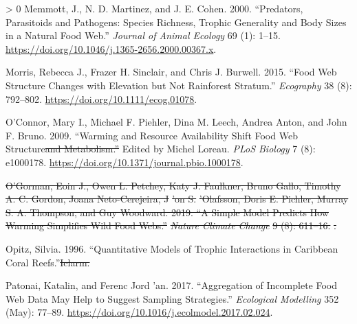 \documentclass{article}
\newlength{\cslhangindent} %
\newenvironment{CSLReferences}[3] %
 {%
  \setlength{\parindent}{0pt} %
  \ifodd #1 \everypar{\setlength{\hangindent}{\cslhangindent}}\ignorespaces\fi %
  \ifnum #2 > 0 %
  \setlength{\parskip}{#2\baselineskip} %
  \fi %
 }%
 {} %
\providecommand{\DIFaddtex}[1]{{\protect\color{blue}\uwave{#1}}} %
\providecommand{\DIFdeltex}[1]{{\protect\color{red}\sout{#1}}}                      %
\providecommand{\DIFaddbegin}{} %
\providecommand{\DIFaddend}{} %
\providecommand{\DIFdelbegin}{} %
\providecommand{\DIFdelend}{} %
\providecommand{\DIFadd}[1]{\texorpdfstring{\DIFaddtex{#1}}{#1}} %
\providecommand{\DIFdel}[1]{\texorpdfstring{\DIFdeltex{#1}}{}} %
\newcommand{\DIFscaledelfig}{0.5}
\newlength{\DIFdelgraphicswidth} %
\newlength{\DIFdelgraphicsheight} %
\newcommand{\DIFaddincludegraphics}[2][]{{\color{blue}\fbox{\DIFOincludegraphics[#1]{#2}}}} %
\newcommand{\DIFdelincludegraphics}[2][]{%
\sbox{\DIFdelgraphicsbox}{\DIFOincludegraphics[#1]{#2}}%
\settoboxwidth{\DIFdelgraphicswidth}{\DIFdelgraphicsbox} %
\settoboxtotalheight{\DIFdelgraphicsheight}{\DIFdelgraphicsbox} %
\scalebox{\DIFscaledelfig}{%
\parbox[b]{\DIFdelgraphicswidth}{\usebox{\DIFdelgraphicsbox}\\[-\baselineskip] \rule{\DIFdelgraphicswidth}{0em}}\llap{\resizebox{\DIFdelgraphicswidth}{\DIFdelgraphicsheight}{%
\setlength{\unitlength}{\DIFdelgraphicswidth}%
\begin{picture}(1,1)%
\thicklines\linethickness{2pt} %
{\color[rgb]{1,0,0}\put(0,0){\framebox(1,1){}}}%
{\color[rgb]{1,0,0}\put(0,0){\line( 1,1){1}}}%
{\color[rgb]{1,0,0}\put(0,1){\line(1,-1){1}}}%
\end{picture}%
}\hspace*{3pt}}} %
} %
\DeclareRobustCommand{\DIFaddbegin}{\DIFOaddbegin \let\includegraphics\DIFaddincludegraphics} %
\DeclareRobustCommand{\DIFaddend}{\DIFOaddend \let\includegraphics\DIFOincludegraphics} %
\DeclareRobustCommand{\DIFdelbegin}{\DIFOdelbegin \let\includegraphics\DIFdelincludegraphics} %
\DeclareRobustCommand{\DIFdelend}{\DIFOaddend \let\includegraphics\DIFOincludegraphics} %
\begin{document}
\begin{CSLReferences}{1}{0}
\leavevmode\hypertarget{ref-memmottPredatorsParasitoidsPathogens2000}{}%
Memmott, J., N. D. Martinez, and J. E. Cohen. 2000. \DIFaddbegin {\DIFaddend ``Predators,
Parasitoids and Pathogens: Species Richness, Trophic Generality and Body
Sizes in a Natural Food Web.''\DIFaddbegin } \DIFaddend \emph{Journal of Animal Ecology} 69 (1):
1--15. \url{https://doi.org/10.1046/j.1365-2656.2000.00367.x}.

\leavevmode\hypertarget{ref-morrisFoodWebStructure2015}{}%
Morris, Rebecca J., Frazer H. Sinclair, and Chris J. Burwell. 2015.
\DIFaddbegin {\DIFaddend ``Food Web Structure Changes with Elevation but Not Rainforest
Stratum.''\DIFaddbegin } \DIFaddend \emph{Ecography} 38 (8): 792--802.
\url{https://doi.org/10.1111/ecog.01078}.

\leavevmode\hypertarget{ref-oconnorWarmingResourceAvailability2009}{}%
O'Connor, Mary I., Michael F. Piehler, Dina M. Leech, Andrea Anton, and
John F. Bruno. 2009. \DIFaddbegin {\DIFaddend ``Warming and \DIFaddbegin {\DIFaddend Resource Availability Shift Food
Web Structure\DIFdelbegin \DIFdel{and Metabolism.'' }\DIFdelend \DIFaddbegin } \DIFadd{and }{\DIFadd{Metabolism}}\DIFadd{.''}} \DIFaddend Edited by Michel Loreau. \emph{PLoS
Biology} 7 (8): e1000178.
\url{https://doi.org/10.1371/journal.pbio.1000178}.

\leavevmode\DIFdelbegin %
\DIFdel{O'Gorman, Eoin J., Owen L. Petchey, Katy J. Faulkner, Bruno Gallo,
Timothy A. C. Gordon, Joana Neto-Cerejeira, J}%
\DIFdel{'on S. }%
\DIFdel{'Olafsson, Doris
E. Pichler, Murray S. A. Thompson, and Guy Woodward. 2019. ``A Simple
Model Predicts How Warming Simplifies Wild Food Webs.'' }\emph{\DIFdel{Nature
Climate Change}} %
\DIFdel{9 (8): 611--16.
}%
\DIFdel{.
}%

\DIFdelend \hypertarget{ref-opitz1996}{}%
Opitz, Silvia. 1996. \DIFaddbegin {\DIFaddend ``Quantitative Models of Trophic Interactions in
Caribbean Coral Reefs.''\DIFdelbegin \DIFdel{Iclarm.
}\DIFdelend \DIFaddbegin }
\DIFaddend 

\leavevmode\hypertarget{ref-patonaiAggregationIncompleteFood2017}{}%
Patonai, Katalin, and Ferenc Jord\DIFdelbegin %
\DIFdelend 'an. 2017. \DIFaddbegin {\DIFaddend ``Aggregation of Incomplete
Food Web Data May Help to Suggest Sampling Strategies.''\DIFaddbegin }
\DIFaddend \emph{Ecological Modelling} 352 (May): 77--89.
\url{https://doi.org/10.1016/j.ecolmodel.2017.02.024}.


\end{CSLReferences}
\end{document}
